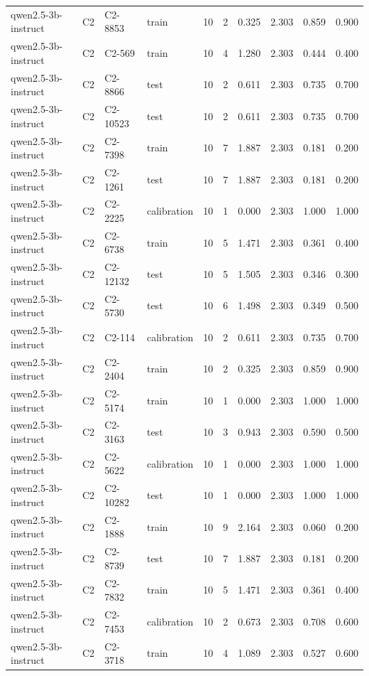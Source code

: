 \begin{table}
\begin{tabular}{llllrrrrrr}
qwen2.5-3b-instruct & C2 & C2-8853 & train & 10 & 2 & 0.325 & 2.303 & 0.859 & 0.900 \\
qwen2.5-3b-instruct & C2 & C2-569 & train & 10 & 4 & 1.280 & 2.303 & 0.444 & 0.400 \\
qwen2.5-3b-instruct & C2 & C2-8866 & test & 10 & 2 & 0.611 & 2.303 & 0.735 & 0.700 \\
qwen2.5-3b-instruct & C2 & C2-10523 & test & 10 & 2 & 0.611 & 2.303 & 0.735 & 0.700 \\
qwen2.5-3b-instruct & C2 & C2-7398 & train & 10 & 7 & 1.887 & 2.303 & 0.181 & 0.200 \\
qwen2.5-3b-instruct & C2 & C2-1261 & test & 10 & 7 & 1.887 & 2.303 & 0.181 & 0.200 \\
qwen2.5-3b-instruct & C2 & C2-2225 & calibration & 10 & 1 & 0.000 & 2.303 & 1.000 & 1.000 \\
qwen2.5-3b-instruct & C2 & C2-6738 & train & 10 & 5 & 1.471 & 2.303 & 0.361 & 0.400 \\
qwen2.5-3b-instruct & C2 & C2-12132 & test & 10 & 5 & 1.505 & 2.303 & 0.346 & 0.300 \\
qwen2.5-3b-instruct & C2 & C2-5730 & test & 10 & 6 & 1.498 & 2.303 & 0.349 & 0.500 \\
qwen2.5-3b-instruct & C2 & C2-114 & calibration & 10 & 2 & 0.611 & 2.303 & 0.735 & 0.700 \\
qwen2.5-3b-instruct & C2 & C2-2404 & train & 10 & 2 & 0.325 & 2.303 & 0.859 & 0.900 \\
qwen2.5-3b-instruct & C2 & C2-5174 & train & 10 & 1 & 0.000 & 2.303 & 1.000 & 1.000 \\
qwen2.5-3b-instruct & C2 & C2-3163 & test & 10 & 3 & 0.943 & 2.303 & 0.590 & 0.500 \\
qwen2.5-3b-instruct & C2 & C2-5622 & calibration & 10 & 1 & 0.000 & 2.303 & 1.000 & 1.000 \\
qwen2.5-3b-instruct & C2 & C2-10282 & test & 10 & 1 & 0.000 & 2.303 & 1.000 & 1.000 \\
qwen2.5-3b-instruct & C2 & C2-1888 & train & 10 & 9 & 2.164 & 2.303 & 0.060 & 0.200 \\
qwen2.5-3b-instruct & C2 & C2-8739 & test & 10 & 7 & 1.887 & 2.303 & 0.181 & 0.200 \\
qwen2.5-3b-instruct & C2 & C2-7832 & train & 10 & 5 & 1.471 & 2.303 & 0.361 & 0.400 \\
qwen2.5-3b-instruct & C2 & C2-7453 & calibration & 10 & 2 & 0.673 & 2.303 & 0.708 & 0.600 \\
qwen2.5-3b-instruct & C2 & C2-3718 & train & 10 & 4 & 1.089 & 2.303 & 0.527 & 0.600 \\

\end{tabular}
\end{table}
